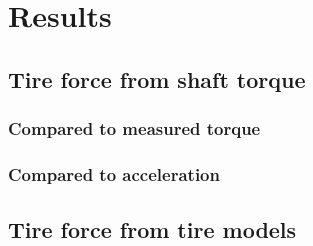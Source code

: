 \chapter{Results}



\section{Tire force from shaft torque}


\subsection{Compared to measured torque}


\subsection{Compared to acceleration}


\section{Tire force from tire models}